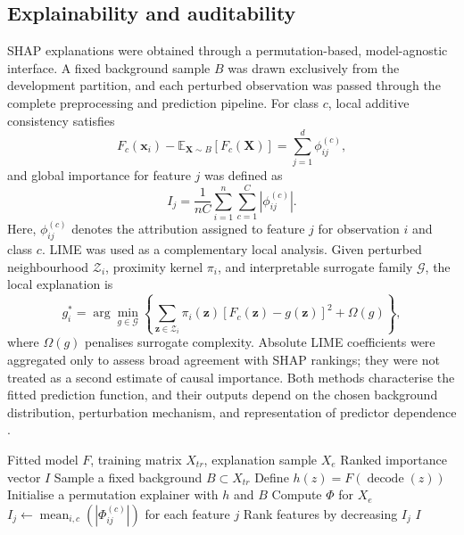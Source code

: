 \documentclass{elektr}
\begin{document}
\subsection{Explainability and auditability}
SHAP explanations were obtained through a permutation-based, model-agnostic interface. A fixed background sample $B$ was drawn exclusively from the development partition, and each perturbed observation was passed through the complete preprocessing and prediction pipeline. For class $c$, local additive consistency satisfies
\begin{equation}
F_c(\mathbf{x}_i)-\mathbb{E}_{\mathbf{X}\sim B}[F_c(\mathbf{X})]
=\sum_{j=1}^{d}\phi_{ij}^{(c)},
\label{eq:shaplocal}
\end{equation}
and global importance for feature $j$ was defined as
\begin{equation}
I_j=\frac{1}{nC}\sum_{i=1}^{n}\sum_{c=1}^{C}|\phi_{ij}^{(c)}|.
\label{eq:shapglobal}
\end{equation}
Here, $\phi_{ij}^{(c)}$ denotes the attribution assigned to feature $j$ for observation $i$ and class $c$. LIME was used as a complementary local analysis. Given perturbed neighbourhood $\mathcal{Z}_i$, proximity kernel $\pi_i$, and interpretable surrogate family $\mathcal{G}$, the local explanation is
\begin{equation}
g_i^{*}=\arg\min_{g\in\mathcal{G}}
\left\{\sum_{\mathbf{z}\in\mathcal{Z}_i}\pi_i(\mathbf{z})
[F_c(\mathbf{z})-g(\mathbf{z})]^2+\Omega(g)\right\},
\label{eq:lime}
\end{equation}
where $\Omega(g)$ penalises surrogate complexity. Absolute LIME coefficients were aggregated only to assess broad agreement with SHAP rankings; they were not treated as a second estimate of causal importance. Both methods characterise the fitted prediction function, and their outputs depend on the chosen background distribution, perturbation mechanism, and representation of predictor dependence \cite{instanceshap2023,jung2023}.

\begin{algorithm}[H]
\caption{Permutation-SHAP procedure for global model auditing}
\label{alg:shap}
\begin{algorithmic}[1]
\Require Fitted model $F$, training matrix $X_{tr}$, explanation sample $X_e$
\Ensure Ranked importance vector $I$
\State Sample a fixed background $B\subset X_{tr}$
\State Define $h(z)=F(\operatorname{decode}(z))$
\State Initialise a permutation explainer with $h$ and $B$
\State Compute $\Phi$ for $X_e$
\State $I_j\gets\operatorname{mean}_{i,c}(|\Phi_{ij}^{(c)}|)$ for each feature $j$
\State Rank features by decreasing $I_j$
\State \Return $I$
\end{algorithmic}
\end{algorithm}
\end{document}
